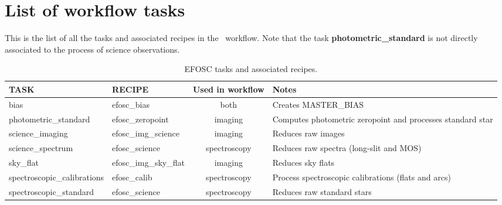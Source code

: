 \section{List of workflow tasks}

This is the list of all the tasks and associated recipes in the
\instname\ workflow.
Note that the task {\bf photometric\_standard} is not directly associated to the process of science observations.


\begin{table}[htbp]
\centering
\scriptsize
\begin{tabular}{|l|l|c|p{7cm}|}
\hline
\textbf{TASK} & \textbf{RECIPE} & \textbf{Used in workflow} & \textbf{Notes} \\
\hline
bias                        & efosc\_bias           & both & Creates MASTER\_BIAS \\
\hline
photometric\_standard       & efosc\_zeropoint      & imaging & Computes photometric zeropoint and processes standard star \\
\hline
science\_imaging            & efosc\_img\_science   & imaging & Reduces raw images \\
\hline
science\_spectrum           & efosc\_science        & spectroscopy & Reduces raw spectra (long-slit and MOS) \\
\hline
sky\_flat                   & efosc\_img\_sky\_flat & imaging & Reduces sky flats \\
\hline
spectroscopic\_calibrations & efosc\_calib          & spectroscopy & Process spectroscopic calibrations (flats and arcs) \\
\hline
spectroscopic\_standard     & efosc\_science        & spectroscopy & Reduces raw standard stars \\
\hline
\end{tabular}
\caption{EFOSC tasks and associated recipes.}
\label{tab:efosc_tasks}
\end{table}
